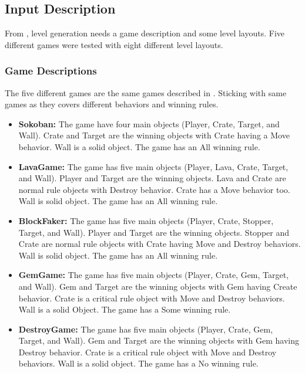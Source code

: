 \subsection{Input Description}
From , level generation needs a game description and some level layouts. Five different games were tested with eight different level layouts.

\subsubsection{Game Descriptions}
The five different games are the same games described in . Sticking with same games as they covers different behaviors and winning rules.
\begin{itemize}
	\item \textbf{Sokoban:} The game have four main objects (Player, Crate, Target, and Wall). Crate and Target are the winning objects with Crate having a Move behavior. Wall is a solid object. The game has an All winning rule.
	
	\item \textbf{LavaGame:} The game has five main objects (Player, Lava, Crate, Target, and Wall). Player and Target are the winning objects. Lava and Crate are normal rule objects with Destroy behavior. Crate has a Move behavior too. Wall is solid object. The game has an All winning rule.
	
	\item \textbf{BlockFaker:} The game has five main objects (Player, Crate, Stopper, Target, and Wall). Player and Target are the winning objects. Stopper and Crate are normal rule objects with Crate having Move and Destroy behaviors. Wall is solid object. The game has an All winning rule.
	
	\item \textbf{GemGame:} The game has five main objects (Player, Crate, Gem, Target, and Wall). Gem and Target are the winning objects with Gem having Create behavior. Crate is a critical rule object with Move and Destroy behaviors. Wall is a solid Object. The game has a Some winning rule.
	
	\item \textbf{DestroyGame:} The game has five main objects (Player, Crate, Gem, Target, and Wall). Gem and Target are the winning objects with Gem having Destroy behavior. Crate is a critical rule object with Move and Destroy behaviors. Wall is a solid object. The game has a No winning rule.
\end{itemize}

